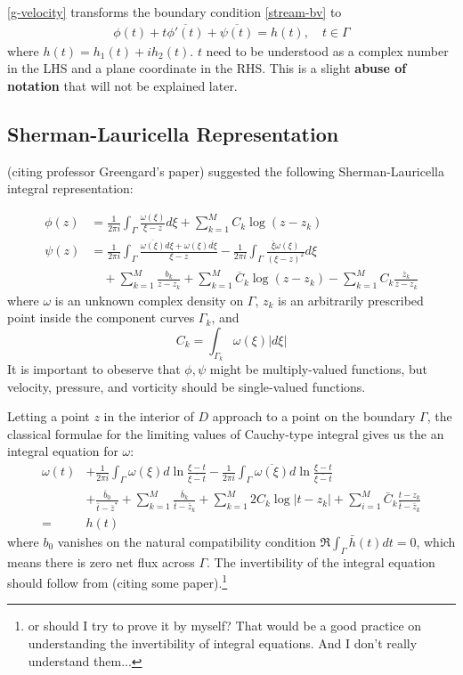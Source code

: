 \documentclass[11pt]{article}
\newtheorem[L]{thm}{Theorem}[section]
\begin{document}
\eqref{g-velocity} transforms the boundary condition \eqref{stream-bv} to 
\begin{align}
  \phi(t) + t\overline{\phi'(t)} + \overline{\psi(t)} 
  = h(t), \quad
  t \in \Gamma
\end{align} where $h(t) =  h_1(t) + ih_2(t)$. $t$ need to be understood as a complex number in the LHS and a plane coordinate in the RHS. This is a slight \textbf{abuse of notation} that will not be explained later. 

\subsection{Sherman-Lauricella Representation}

(citing professor Greengard's paper) suggested the following Sherman-Lauricella integral representation: 

\begin{align}
  \phi(z) &=
    \frac {1}{2\pi i} \int_\Gamma \frac{\omega(\xi)}{\xi - z} d\xi  
    + \sum_{k=1}^M C_k \log (z-z_k)
    \\
  \psi(z) &=
    \frac {1}{2\pi i} \int_\Gamma \frac{\overline{\omega(\xi)}d\xi +  \omega(\xi)\overline{d\xi}}{\xi - z}  
    - \frac {1}{2\pi i} \int_\Gamma \frac{\overline{\xi} \omega(\xi)}{(\xi - z)^2} d\xi  
    \\
    & \quad + \sum _{k=1}^M \frac{b_k}{z-z_k}  
      + \sum_{k=1}^M \overline C_k \log (z-z_k) - \sum_{k=1}^M C_k \frac{\overline z_k}{z-z_k} \nonumber
\end{align}
where $\omega$ is an unknown complex density on $\Gamma$, $z_k$ is an arbitrarily prescribed point inside the component curves $\Gamma_k$, and $$C_k = \int_{\Gamma_k} \omega(\xi) |d\xi|$$
It is important to obeserve that $\phi,\psi$ might be multiply-valued functions, but velocity, pressure, and vorticity should be single-valued functions. 


Letting a point $z$ in the interior of $D$ approach to a point on the boundary $\Gamma$, the classical formulae for the limiting values of Cauchy-type integral gives us the an integral equation for $\omega$:
\begin{align}
  \omega(t) 
  &+ \frac 1{2\pi i} \int_{\Gamma} \omega(\xi) d \ln \frac{\xi - t}{\overline{\xi - t}} - \frac 1{2\pi i} \int_\Gamma \overline{\omega(\xi)} d \ln \frac{\xi - t}{\overline{\xi - t}} \\
  &+ \frac{\overline b_0}{\bar t - \bar z^*} + \sum_{k=1}^M \frac{\bar b_k}{\bar t- \bar z_k} + \sum_{k=1}^M 2C_k \log |t-z_k| + \sum_{i=1}^M \bar C_k \frac{t-z_k}{\bar t - \bar z_k} \\
  =& h(t)
\end{align}
where $b_0$ vanishes on the natural compatibility condition $\Re \int_\Gamma \bar h(t) dt = 0$, which means there is zero net flux across $\Gamma$. The invertibility of the integral equation should follow from (citing some paper).\footnote{or should I try to prove it by myself? That would be a good practice on understanding the invertibility of integral equations. And I don't really understand them...} 
\end{document}
